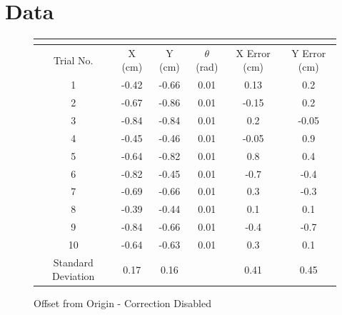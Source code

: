 \documentclass[11pt]{article} %
\begin{document}
\section{Data}
\begin{figure}[h]
\begin{center}
\caption{Offset from Origin - Correction Disabled}
\begin{tabular}{ | c | c | c | c | c | c |}
\multicolumn{4}{c}{} \\ \hline
Trial No. & X (cm) & Y (cm) & $\theta$ (rad) & X Error (cm) & Y Error (cm) \\ \hline
1 & -0.42 & -0.66 & 0.01 & 0.13 & 0.2\\ \hline
2 & -0.67 & -0.86 & 0.01 & -0.15 & 0.2\\ \hline
3 & -0.84 & -0.84 & 0.01 & 0.2 & -0.05\\ \hline
4 & -0.45 & -0.46 & 0.01 & -0.05 & 0.9\\ \hline
5 & -0.64 & -0.82 & 0.01 & 0.8 & 0.4\\ \hline
6 & -0.82 & -0.45 & 0.01 & -0.7 & -0.4\\ \hline
7 & -0.69 & -0.66 & 0.01 & 0.3 & -0.3\\ \hline
8 & -0.39 & -0.44 & 0.01 & 0.1 & 0.1\\ \hline
9 & -0.84 & -0.66 & 0.01 & -0.4 & -0.7\\ \hline
10 & -0.64 & -0.63 & 0.01 & 0.3 & 0.1\\ \hline
Standard Deviation & 0.17 & 0.16 & & 0.41 & 0.45\\ \hline
\end{tabular}
\end{center}
\end{figure}
\end{document}
